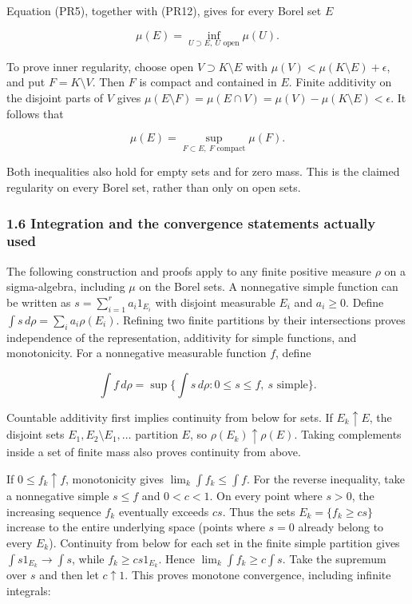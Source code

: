 \documentclass[
  11pt,
]{article}
\begin{document}
Equation (PR5), together with (PR12), gives for every Borel set \(E\)

\[
\mu(E)=\inf_{U\supset E,\ U\text{ open}}\mu(U).
\tag{PR13}
\]

To prove inner regularity, choose open \(V\supset K\setminus E\) with
\(\mu(V)<\mu(K\setminus E)+\epsilon\), and put \(F=K\setminus V\). Then
\(F\) is compact and contained in \(E\). Finite additivity on the
disjoint parts of \(V\) gives
\(\mu(E\setminus F)=\mu(E\cap V)=\mu(V)-\mu(K\setminus E)<\epsilon\). It
follows that

\[
\mu(E)=\sup_{F\subset E,\ F\text{ compact}}\mu(F).
\tag{PR14}
\]

Both inequalities also hold for empty sets and for zero mass. This is
the claimed regularity on every Borel set, rather than only on open
sets.

\subsubsection{1.6 Integration and the convergence statements actually
used}\label{integration-and-the-convergence-statements-actually-used}

The following construction and proofs apply to any finite positive
measure \(\rho\) on a sigma-algebra, including \(\mu\) on the Borel
sets. A nonnegative simple function can be written as
\(s=\sum_{i=1}^ra_i1_{E_i}\) with disjoint measurable \(E_i\) and
\(a_i\geq0\). Define \(\int s\,d\rho=\sum_i a_i\rho(E_i)\). Refining two
finite partitions by their intersections proves independence of the
representation, additivity for simple functions, and monotonicity. For a
nonnegative measurable function \(f\), define

\[
\int f\,d\rho=\sup\{\int s\,d\rho:0\leq s\leq f,\ s\text{ simple}\}.
\tag{PR15}
\]

Countable additivity first implies continuity from below for sets. If
\(E_k\uparrow E\), the disjoint sets \(E_1,E_2\setminus E_1,\ldots\)
partition \(E\), so \(\rho(E_k)\uparrow\rho(E)\). Taking complements
inside a set of finite mass also proves continuity from above.

If \(0\leq f_k\uparrow f\), monotonicity gives
\(\lim_k\int f_k\leq\int f\). For the reverse inequality, take a
nonnegative simple \(s\leq f\) and \(0<c<1\). On every point where
\(s>0\), the increasing sequence \(f_k\) eventually exceeds \(cs\). Thus
the sets \(E_k=\{f_k\geq cs\}\) increase to the entire underlying space
(points where \(s=0\) already belong to every \(E_k\)). Continuity from
below for each set in the finite simple partition gives
\(\int s1_{E_k}\to\int s\), while \(f_k\geq cs1_{E_k}\). Hence
\(\lim_k\int f_k\geq c\int s\). Take the supremum over \(s\) and then
let \(c\uparrow1\). This proves monotone convergence, including infinite
integrals:
\end{document}

